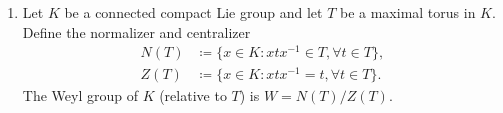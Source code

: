 \begin{enumerate}
    The hyperplanes intersect $E$ into disconnected components. Each component is called a Weyl chamber.
    \item Let $K$ be a connected compact Lie group and let $T$ be a maximal torus in $K$. Define the normalizer and centralizer
    \begin{align*}
        N(T) &\coloneq \{ x\in K: xtx^{-1} \in T, \forall t\in T \}, \\
        Z(T) &\coloneq \{ x\in K: xtx^{-1}=t, \forall t\in T \}.
    \end{align*}
    The Weyl group of $K$ (relative to $T$) is $W=N(T)/Z(T)$.
\end{enumerate}
